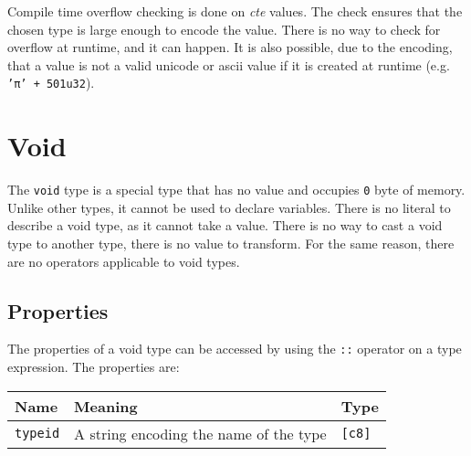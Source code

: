 Compile time overflow checking is done on \textit{cte} values. The check ensures
that the chosen type is large enough to encode the value. There is no way to
check for overflow at runtime, and it can happen. It is also possible, due to
the encoding, that a value is not a valid unicode or ascii value if it is
created at runtime (e.g. \texttt{'π' + 501u32}).

\section{Void}
\label{sec:org409c2d8}

The \texttt{void} type is a special type that has no value and occupies
\texttt{0} byte of memory. Unlike other types, it cannot be used to declare
variables. There is no literal to describe a void type, as it cannot take a
value. There is no way to cast a void type to another type, there is no value to
transform. For the same reason, there are no operators applicable to void types.

\vspace{-10pt}
\subsection{Properties}
\label{sec:orgffa98ee}

The properties of a void type can be accessed by using the \texttt{::} operator
on a type expression. The properties are:

\begin{center}
  \vspace{-5pt}
  \begin{adjustbox}{max width=\linewidth}
    \begin{tabular}{|l|ll|}
      \hline
      Name & Meaning & Type\\[0pt]
      \hline
      \hline
      \texttt{typeid} & A string encoding the name of the type & \texttt{[c8]}\\[0pt]
      \hline
    \end{tabular}
  \end{adjustbox}
\end{center}
